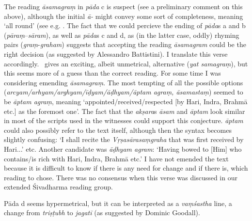 {{  The reading \textit{āsamagraṃ} in \textit{pāda} c is suspect 
  {\rm (}see a preliminary comment on this above{\rm )},
  although the initial \textit{ā-} might convey some sort of
  completeness, meaning `all round'
  {\rm (}see e.g. .
  The fact that we could percieve the ending of \textit{pāda}s a and b 
  {\rm (}\textit{pāraṃ}--\textit{sāram}{\rm )}, as well as \textit{pāda}s c and d, as {\rm (}in the 
  latter case, oddly{\rm )} rhyming pairs {\rm (}\textit{graṃ}-\textit{graham}{\rm )}
  suggests that accepting the reading \textit{āsamagram} could be 
  the right decision {\rm (}as suggested by Alessandro Battistini{\rm )}.
  I translate this verse accordingly. \msM\ gives an exciting,
  albeit unmetrical, alternative {\rm (}\textit{yat samagraṃ}{\rm )}, but
  this seems more of a guess than the correct reading.
  For some time I was considering emending \textit{āsamagraṃ}.
  The most tempting of all the possible options 
  {\rm (}\textit{arcyam/arhyam/arghyam/īḍyam/āḍhyam/āptam agraṃ, āsamastaṃ}{\rm )} 
  seemed to be \textit{āptam agraṃ},
  meaning `appointed/received/respected [by Hari, Indra,
  Brahmā etc.] as the foremost one'. The fact that 
  the \textit{akṣara}s \textit{āsam} and \textit{āptam} look similar in most
  of the scripts used in the witnesses could support this
  conjecture. \textit{āptam} could also
  possibly refer to the text itself, although then the
  syntax becomes slightly confusing: `I shall recite the
  \textit{Vṛṣasārasaṃgraha} that was first received by Hari...' etc.
  Another candidate was \textit{āḍhyam agram}:
  `Having bowed to [Him] who contains/is rich with Hari, Indra, Brahmā
  etc.' I have not emended the text because it is difficult
  to know if there is any need for change and if there is, which reading 
  to chose. There was no consensus when this verse was discussed 
  in our extended Śivadharma reading group.
 
  
 
  Pāda d seems hypermetrical, but it can be interpreted as a \textit{vaṃśastha}
  line, a change from \textit{triṣṭubh} to \textit{jagatī} {\rm (}as suggested by Dominic Goodall{\rm )}.
 }}




